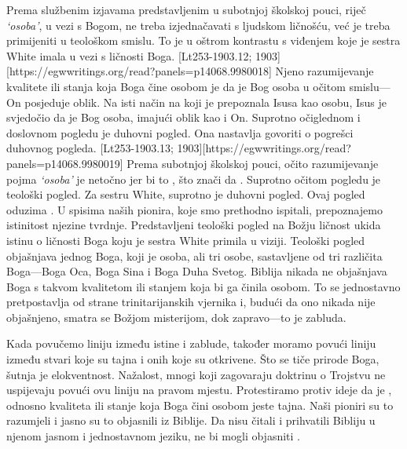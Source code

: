 Prema službenim izjavama predstavljenim u subotnjoj školskoj pouci, riječ \textit{‘osoba’}, u vezi s Bogom, ne treba izjednačavati s ljudskom ličnošću, već je treba primijeniti u teološkom smislu. To je u oštrom kontrastu s viđenjem koje je sestra White imala u vezi s ličnosti Boga. [Lt253-1903.12; 1903][https://egwwritings.org/read?panels=p14068.9980018] Njeno razumijevanje kvalitete ili stanja koja Boga čine osobom je da je Bog osoba u očitom smislu—On posjeduje oblik. Na isti način na koji je prepoznala Isusa kao osobu, Isus je svjedočio da je Bog osoba, imajući oblik kao i On. Suprotno očiglednom i doslovnom pogledu je duhovni pogled. Ona nastavlja govoriti o pogrešci duhovnog pogleda. [Lt253-1903.13; 1903][https://egwwritings.org/read?panels=p14068.9980019] Prema subotnjoj školskoj pouci, očito razumijevanje pojma \textit{‘osoba’} je netočno jer bi to , što znači da . Suprotno očitom pogledu je teološki pogled. Za sestru White, suprotno je duhovni pogled. Ovaj pogled oduzima . U spisima naših pionira, koje smo prethodno ispitali, prepoznajemo istinitost njezine tvrdnje. Predstavljeni teološki pogled na Božju ličnost ukida istinu o ličnosti Boga koju je sestra White primila u viziji. Teološki pogled objašnjava jednog Boga, koji je osoba, ali tri osobe, sastavljene od tri različita Boga—Boga Oca, Boga Sina i Boga Duha Svetog. Biblija nikada ne objašnjava Boga s takvom kvalitetom ili stanjem koja bi ga činila osobom. To se jednostavno pretpostavlja od strane trinitarijanskih vjernika i, budući da ono nikada nije objašnjeno, smatra se Božjom misterijom, dok zapravo—to je zabluda.

Kada povučemo liniju između istine i zablude, također moramo povući liniju između stvari koje su tajna i onih koje su otkrivene. Što se tiče prirode Boga, šutnja je elokventnost. Nažalost, mnogi koji zagovaraju doktrinu o Trojstvu ne uspijevaju povući ovu liniju na pravom mjestu. Protestiramo protiv ideje da je , odnosno kvaliteta ili stanje koja Boga čini osobom jeste tajna. Naši pioniri su to razumjeli i jasno su to objasnili iz Biblije. Da nisu čitali i prihvatili Bibliju u njenom jasnom i jednostavnom jeziku, ne bi mogli objasniti .

